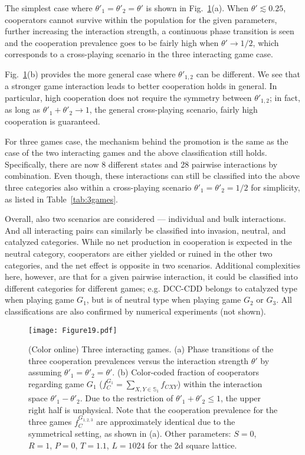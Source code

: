 \documentclass[showpacs,superscriptaddress,reprint,nofootinbib,amsmath,amssymb,aps,pre]{revtex4-1}
\begin{document}
The simplest case where $\theta'_1=\!\theta'_2=\!\theta'$ is shown in Fig.~\ref{fig:more}(a). When $\theta'\lesssim 0.25$, cooperators cannot survive within the population for the given parameters, further increasing the interaction strength, a continuous phase transition is seen and the cooperation prevalence goes to be fairly high when $\theta'\rightarrow 1/2$, which corresponds to a cross-playing scenario in the three interacting game case.

Fig.~\ref{fig:more}(b) provides the more general case where $\theta'_{1,2}$ can be different. We see that a stronger game interaction leads to better cooperation holds in general. In particular, high cooperation does not require the symmetry between $\theta'_{1,2}$; in fact, as long as $\theta'_1+\theta'_2\rightarrow 1$, the general cross-playing scenario, fairly high cooperation is guaranteed. 

For three games case, the mechanism behind the promotion is the same as the case of the two interacting games and the above classification still holds. Specifically, there are now 8 different states and 28 pairwise interactions by combination. Even though, these interactions can still be classified into the above three categories also within a cross-playing scenario $\theta'_1\!=\!\theta'_2\!=\!1/2$ for simplicity, as listed in Table~\ref{tab:3games}.

Overall, also two scenarios are considered --- individual and bulk interactions. And all interacting pairs can similarly be classified into invasion, neutral, and catalyzed categories. While no net production in cooperation is expected in the neutral category, cooperators are either yielded or ruined in the other two categories, and the net effect is opposite in two scenarios. Additional complexities here, however, are that for a given pairwise interaction, it could be classified into different categories for different games; e.g.  DCC-CDD belongs to catalyzed type when playing game $G_1$, but is of neutral type when playing game $G_2$ or $G_3$. All classifications are also confirmed by numerical experiments (not shown).

\begin{figure}[t]
\centering
\texttt{[image: Figure19.pdf]}
\caption{(Color online)
Three interacting games.
(a) Phase transitions of the three cooperation prevalences versus the interaction strength $\theta'$ by assuming $\theta'_1=\theta'_2=\theta'$. 
(b) Color-coded fraction of cooperators regarding game $G_1$ ($f^{G_1}_C=\sum_{X,Y\in\mathbb{S}_1}f_{CXY}$) within the interaction space $\theta'_1-\theta'_2$. Due to the restriction of $\theta'_1+\theta'_2\le1$, the upper right half is unphysical. Note that the cooperation prevalence for the three games $f^{G_{1,2,3}}_C$ are approximately identical due to the symmetrical setting, as shown in (a). 
Other parameters: $S=0$, $R=1$, $P=0$, $T=1.1$, $L=1024$ for the 2d square lattice.
}
\label{fig:more}
\end{figure}
\end{document}

